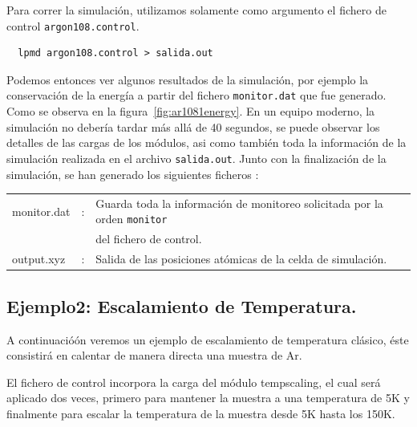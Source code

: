 Para correr la simulaci\'on, utilizamos solamente como argumento el fichero de control \verb|argon108.control|.
\begin{verbatim}
  lpmd argon108.control > salida.out
\end{verbatim}


Podemos entonces ver algunos resultados de la simulaci\'on, por ejemplo la conservaci\'on de la energ\'ia a partir del fichero \verb|monitor.dat| que fue generado. Como se observa en la figura~\ref{fig:ar1081energy}. En un equipo moderno, la simulaci\'on no deber\'ia tardar m\'as all\'a de 40 segundos, se puede observar los detalles de las cargas de los m\'odulos, asi como tambi\'en toda la informaci\'on de la simulaci\'on realizada en el archivo \verb|salida.out|. Junto con la finalizaci\'on de la simulaci\'on, se han generado los siguientes ficheros :

\begin{tabular}{lcl}\\
 monitor.dat &:& Guarda toda la informaci\'on de monitoreo solicitada por la orden \verb|monitor|\\
&& del fichero de control. \\
 output.xyz &:& Salida de las posiciones at\'omicas de la celda de simulaci\'on. \\
\end{tabular}

\subsection{Ejemplo2: Escalamiento de Temperatura.}

A continuació\'on veremos un ejemplo de escalamiento de temperatura cl\'asico, \'este consistir\'a en calentar de manera directa una muestra de Ar. 

El fichero de control incorpora la carga del m\'odulo tempscaling, el cual será aplicado dos veces, primero para mantener la muestra a una temperatura de 5K y finalmente para escalar la temperatura de la muestra desde 5K hasta los 150K.

